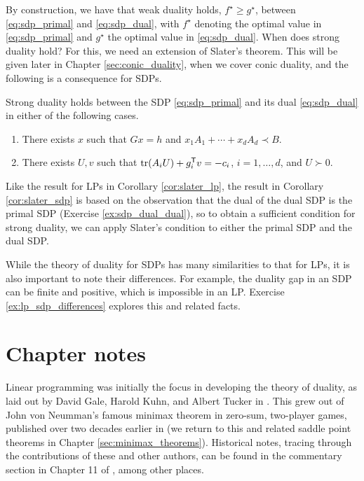 By construction, we have that weak duality holds, $f^\star \geq g^\star$,
between \eqref{eq:sdp_primal} and \eqref{eq:sdp_dual}, with $f^\star$ denoting 
the optimal value in \eqref{eq:sdp_primal} and $g^\star$ the optimal value in 
\eqref{eq:sdp_dual}. When does strong duality hold? For this, we need an
extension of Slater's theorem. This will be given later in Chapter
\ref{sec:conic_duality}, when we cover conic duality, and the following is a    
consequence for SDPs. 

\begin{Corollary}
\label{cor:slater_sdp}
Strong duality holds between the SDP \eqref{eq:sdp_primal} and its dual
\eqref{eq:sdp_dual} in either of the following cases. 

\begin{enumerate}[label=(\roman*)]
\item There exists $x$ such that $Gx = h$ and $x_1 A_1 + \cdots + x_d A_d 
  \prec B$.  
\item There exists $U,v$ such that $\operatorname{tr}(A_iU) + g_i^{\mathsf{T}} v = -c_i$, $i =
  1,\dots,d$, and $U \succ 0$. 
\end{enumerate}
\end{Corollary}

Like the result for LPs in Corollary \ref{cor:slater_lp}, the result in
Corollary \ref{cor:slater_sdp} is based on the observation that the dual of the 
dual SDP is the primal SDP (Exercise \ref{ex:sdp_dual_dual}), so to obtain
a sufficient condition for strong duality, we can apply Slater's condition to
either the primal SDP and the dual SDP. 

While the theory of duality for SDPs has many similarities to that for LPs, it is
also important to note their differences. For example, the duality gap in an SDP
can be finite and positive, which is impossible in an LP. Exercise
\ref{ex:lp_sdp_differences} explores this and related facts.     

\SkipTocEntry\section*{Chapter notes}

Linear programming was initially the focus in developing the theory of 
duality, as laid out by David Gale, Harold Kuhn, and Albert Tucker in
\cite{gale1951linear}. This grew out of John von Neumman's famous minimax 
theorem in zero-sum, two-player games, published over two decades
earlier in \cite{vonneumann1928theorie} (we return to this and related
saddle point theorems in Chapter \ref{sec:minimax_theorems}). Historical
notes, tracing through the contributions of these and other authors, can be
found in the commentary section in Chapter 11 of
\cite{rockafellar2009variational}, among other places.

